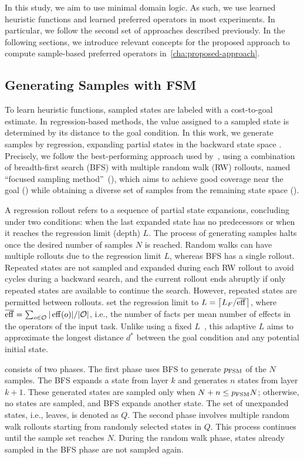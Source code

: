 \documentclass[ppgc,diss,english]{iiufrgs}
\providecommand{\ceil}[1]{\ensuremath{\left\lceil #1\right\rceil}}
\begin{document}
In this study, we aim to use minimal domain logic. As such, we use learned heuristic functions and learned preferred operators in most experiments. In particular, we follow the second set of approaches described previously. In the following sections, we introduce relevant concepts for the proposed approach to compute sample-based preferred operators in~\cref{cha:proposed-approach}.


\subsection{Generating Samples with FSM}
\label{sec:sample-learn-h}
To learn heuristic functions, sampled states are labeled with a cost-to-goal estimate. In regression-based methods, the value assigned to a sampled state is determined by its distance to the goal condition. In this work, we generate samples by regression, expanding partial states in the backward state space \bsp. Precisely, we follow the best-performing approach used by~\citet{Bettker.etal/2022}, using a combination of breadth-first search (BFS) with multiple random walk (RW) rollouts, named ``focused sampling method''~(\bfsrw), which aims to achieve good coverage near the goal (\bfs) while obtaining a diverse set of samples from the remaining state space (\rw).

A regression rollout refers to a sequence of partial state expansions, concluding under two conditions: when the last expanded state has no predecessors or when it reaches the regression limit (depth) $L$. The process of generating samples halts once the desired number of samples $N$ is reached. Random walks can have multiple rollouts due to the regression limit $L$, whereas BFS has a single rollout. Repeated states are not sampled and expanded during each RW rollout to avoid cycles during a backward search, and the current rollout ends abruptly if only repeated states are available to continue the search. However, repeated states are permitted between rollouts.
\citet{Bettker.etal/2022} set the regression limit to $L=\ceil{\facts/\overline{\eff}}$, where $\overline{\operatorname{eff}}=\sum_{o\in \mathcal{O}} |\operatorname{eff}(o)|/|\mathcal{O}|$, i.e., the number of facts per mean number of effects in the operators of the input task. Unlike using a fixed $L$~\cite{Yu.etal/2020, OToole/2022}, this adaptive $L$ aims to approximate the longest distance $d^{*}$ between the goal condition and any potential initial state.

\bfsrw consists of two phases. The first phase uses BFS to generate $p_\text{FSM}$ of the $N$ samples. The BFS expands a state from layer $k$ and generates $n$ states from layer $k+1$. These generated states are sampled only when $N + n \leq p_{\text{FSM}}N$; otherwise, no states are sampled, and BFS expands another state. The set of unexpanded states, i.e., leaves, is denoted as $Q$. The second phase involves multiple random walk rollouts starting from randomly selected states in $Q$. This process continues until the sample set reaches $N$. During the random walk phase, states already sampled in the BFS phase are not sampled again.
\end{document}
